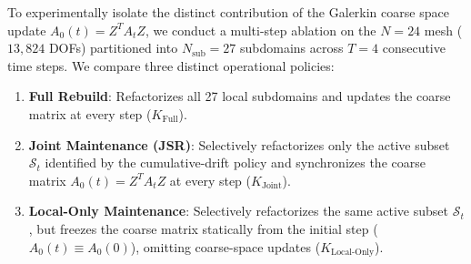 \documentclass[preprint,12pt,3p]{elsarticle}
\begin{document}
To experimentally isolate the distinct contribution of the Galerkin coarse space update $A_0(t) = Z^T A_t Z$, we conduct a multi-step ablation on the $N=24$ mesh ($13,824$ DOFs) partitioned into $N_{\text{sub}} = 27$ subdomains across $T=4$ consecutive time steps. We compare three distinct operational policies:
\begin{enumerate}
    \item \textbf{Full Rebuild}: Refactorizes all 27 local subdomains and updates the coarse matrix at every step ($K_{\text{Full}}$).
    \item \textbf{Joint Maintenance (JSR)}: Selectively refactorizes only the active subset $\mathcal{S}_t$ identified by the cumulative-drift policy and synchronizes the coarse matrix $A_0(t) = Z^T A_t Z$ at every step ($K_{\text{Joint}}$).
    \item \textbf{Local-Only Maintenance}: Selectively refactorizes the same active subset $\mathcal{S}_t$, but freezes the coarse matrix statically from the initial step ($A_0(t) \equiv A_0(0)$), omitting coarse-space updates ($K_{\text{Local-Only}}$).
\end{enumerate}

\begin{table}[htbp]
\centering
\small
\caption{Multi-step comparison between Full Rebuild, Joint JSR, and Local-Only maintenance ($N=24$, 27 subdomains, 4 time steps).}
\label{tab:coarse_ablation}
\end{table}
\end{document}
